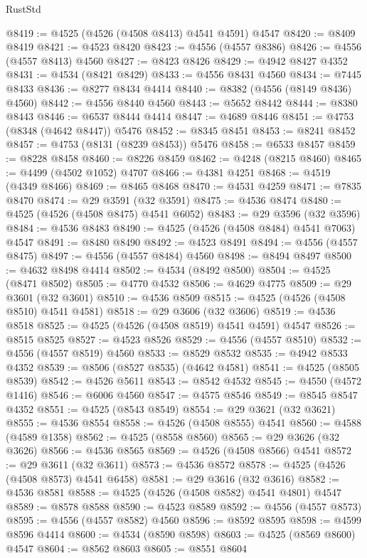 \begin{lexlean}{RustStd}
\begin{coremodule}
@8419 := @4525 (@4526 (@4508 @8413) @4541 @4591) @4547
@8420 := @8409 @8419
@8421 := @4523 @8420
@8423 := @4556 (@4557 @8386)
@8426 := @4556 (@4557 @8413) @4560
@8427 := @8423 @8426
@8429 := @4942 @8427 @4352
@8431 := @4534 (@8421 @8429)
@8433 := @4556 @8431 @4560
@8434 := @7445 @8433
@8436 := @8277 @8434 @4414
@8440 := @8382 (@4556 (@8149 @8436) @4560)
@8442 := @4556 @8440 @4560
@8443 := @5652 @8442
@8444 := @8380 @8443
@8446 := @6537 @8444 @4414
@8447 := @4689 @8446
@8451 := @4753 (@8348 (@4642 @8447)) @5476
@8452 := @8345 @8451
@8453 := @8241 @8452
@8457 := @4753 (@8131 (@8239 @8453)) @5476
@8458 := @6533 @8457
@8459 := @8228 @8458
@8460 := @8226 @8459
@8462 := @4248 (@8215 @8460)
@8465 := @4499 (@4502 @1052) @4707
@8466 := @4381 @4251
@8468 := @4519 (@4349 @8466)
@8469 := @8465 @8468
@8470 := @4531 @4259
@8471 := @7835 @8470
@8474 := @29 @3591 (@32 @3591)
@8475 := @4536 @8474
@8480 := @4525 (@4526 (@4508 @8475) @4541 @6052)
@8483 := @29 @3596 (@32 @3596)
@8484 := @4536 @8483
@8490 := @4525 (@4526 (@4508 @8484) @4541 @7063) @4547
@8491 := @8480 @8490
@8492 := @4523 @8491
@8494 := @4556 (@4557 @8475)
@8497 := @4556 (@4557 @8484) @4560
@8498 := @8494 @8497
@8500 := @4632 @8498 @4414
@8502 := @4534 (@8492 @8500)
@8504 := @4525 (@8471 @8502)
@8505 := @4770 @4532
@8506 := @4629 @4775
@8509 := @29 @3601 (@32 @3601)
@8510 := @4536 @8509
@8515 := @4525 (@4526 (@4508 @8510) @4541 @4581)
@8518 := @29 @3606 (@32 @3606)
@8519 := @4536 @8518
@8525 := @4525 (@4526 (@4508 @8519) @4541 @4591) @4547
@8526 := @8515 @8525
@8527 := @4523 @8526
@8529 := @4556 (@4557 @8510)
@8532 := @4556 (@4557 @8519) @4560
@8533 := @8529 @8532
@8535 := @4942 @8533 @4352
@8539 := @8506 (@8527 @8535) (@4642 @4581)
@8541 := @4525 (@8505 @8539)
@8542 := @4526 @5611
@8543 := @8542 @4532
@8545 := @4550 (@4572 @1416)
@8546 := @6006 @4560
@8547 := @4575 @8546
@8549 := @8545 @8547 @4352
@8551 := @4525 (@8543 @8549)
@8554 := @29 @3621 (@32 @3621)
@8555 := @4536 @8554
@8558 := @4526 (@4508 @8555) @4541
@8560 := @4588 (@4589 @1358)
@8562 := @4525 (@8558 @8560)
@8565 := @29 @3626 (@32 @3626)
@8566 := @4536 @8565
@8569 := @4526 (@4508 @8566) @4541
@8572 := @29 @3611 (@32 @3611)
@8573 := @4536 @8572
@8578 := @4525 (@4526 (@4508 @8573) @4541 @6458)
@8581 := @29 @3616 (@32 @3616)
@8582 := @4536 @8581
@8588 := @4525 (@4526 (@4508 @8582) @4541 @4801) @4547
@8589 := @8578 @8588
@8590 := @4523 @8589
@8592 := @4556 (@4557 @8573)
@8595 := @4556 (@4557 @8582) @4560
@8596 := @8592 @8595
@8598 := @4599 @8596 @4414
@8600 := @4534 (@8590 @8598)
@8603 := @4525 (@8569 @8600) @4547
@8604 := @8562 @8603
@8605 := @8551 @8604

\end{coremodule}
\end{lexlean}
